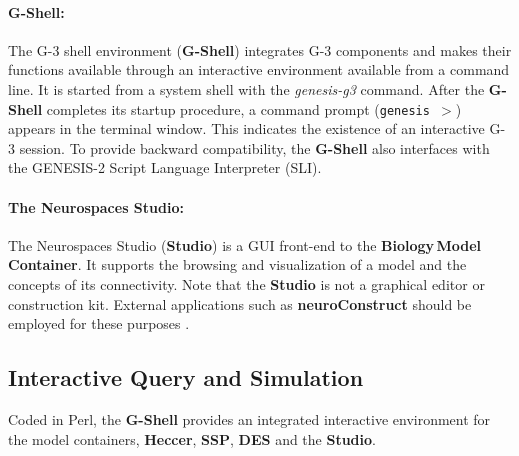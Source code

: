 \documentclass[11pt,3p,twocolumn]{JMN}
\begin{document}
\paragraph{G-Shell:} The G-3 shell environment ({\bf G-Shell}) integrates G-3 components and makes their functions available through an interactive environment available from a command line.  It is started from a system shell with the {\it genesis-g3} command. After the {\bf G-Shell} completes its startup procedure, a command prompt  ({\tt genesis\,$>$}) appears in the terminal window. This indicates the existence of an interactive G-3 session. To provide backward compatibility, the {\bf G-Shell} also interfaces with the GENESIS-2 Script Language Interpreter (SLI). 

\paragraph{The Neurospaces Studio:} The Neurospaces Studio ({\bf Studio}) is a GUI front-end to the {\bf Biology\,Model\,Container}.  It supports the browsing and visualization of a model and the concepts of its connectivity\cite{nordlie09:_visual}.  Note that the {\bf Studio} is not a graphical editor or construction kit.  External applications such as {\bf neuroConstruct} should be employed for these purposes \cite{gleeson07}.

\subsection{Interactive Query and Simulation}

Coded in Perl, the {\bf G-Shell} provides an integrated interactive environment for the model containers, {\bf Heccer}, {\bf SSP}, {\bf DES} and the {\bf Studio}.

\end{document}
